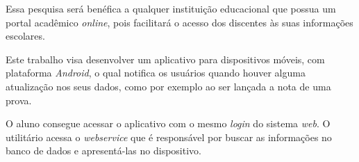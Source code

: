 
	\par Essa pesquisa será benéfica a qualquer instituição educacional que possua
um portal acadêmico \textit{online}, pois facilitará o acesso dos discentes às suas
informações escolares.

	\par Este trabalho visa desenvolver um aplicativo para dispositivos móveis, 
com plataforma \textit{Android}, o qual notifica os usuários quando houver alguma
atualização nos seus dados, como por exemplo ao ser lançada a nota de uma prova.
	
	\par O aluno consegue acessar o aplicativo com o mesmo \textit{login} do
sistema \textit{web}. O utilitário acessa o \textit{webservice} que é
responsável por buscar as informações no banco de dados e apresentá-las no
dispositivo.